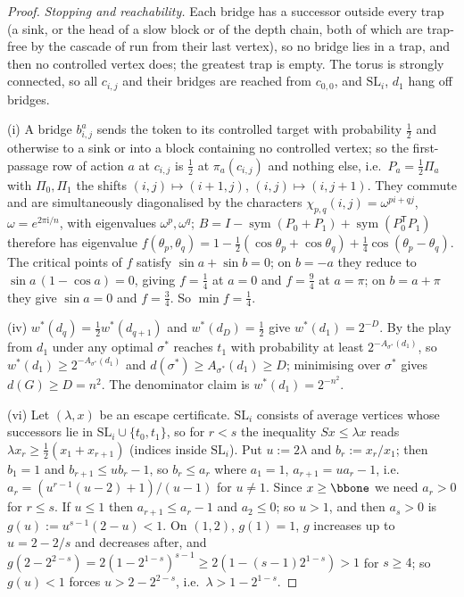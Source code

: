 \begin{proof}
\emph{Stopping and reachability.} Each bridge has a successor outside every
trap (a sink, or the head of a slow block or of the depth chain, both of which
are trap-free by the cascade of  run from their last
vertex), so no bridge lies in a trap, and then no controlled vertex does; the
greatest trap is empty. The torus is strongly connected, so all $c_{i,j}$ and
their bridges are reached from $c_{0,0}$, and $\mathrm{SL}_i$, $d_1$ hang off
bridges.

(i) A bridge $b^{a}_{i,j}$ sends the token to its controlled target with
probability $\tfrac12$ and otherwise to a sink or into a block containing no
controlled vertex; so the first-passage row of action $a$ at $c_{i,j}$ is
$\tfrac12$ at $\pi_a(c_{i,j})$ and nothing else, i.e.\ $P_a=\tfrac12\Pi_a$ with
$\Pi_0,\Pi_1$ the shifts $(i,j)\mapsto(i+1,j)$, $(i,j)\mapsto(i,j+1)$. They
commute and are simultaneously diagonalised by the characters
$\chi_{p,q}(i,j)=\omega^{pi+qj}$, $\omega=e^{2\pi\mathrm i/n}$, with eigenvalues
$\omega^{p},\omega^{q}$; $B=I-\operatorname{sym}(P_0+P_1)+\operatorname{sym}(P_0^{\mathsf T}P_1)$
therefore has eigenvalue
$f(\theta_p,\theta_q)=1-\tfrac12(\cos\theta_p+\cos\theta_q)+\tfrac14\cos(\theta_p-\theta_q)$.
The critical points of $f$ satisfy $\sin a+\sin b=0$; on $b=-a$ they reduce to
$\sin a\,(1-\cos a)=0$, giving $f=\tfrac14$ at $a=0$ and $f=\tfrac94$ at
$a=\pi$; on $b=a+\pi$ they give $\sin a=0$ and $f=\tfrac34$. So
$\min f=\tfrac14$.

(iv) $w^\ast(d_q)=\tfrac12w^\ast(d_{q+1})$ and $w^\ast(d_D)=\tfrac12$ give
$w^\ast(d_1)=2^{-D}$. By  the play from $d_1$ under
any optimal $\sigma^{\ast}$ reaches $t_1$ with probability at least
$2^{-A_{\sigma^\ast}(d_1)}$, so $w^\ast(d_1)\ge2^{-A_{\sigma^{\ast}}(d_1)}$ and
$d(\sigma^{\ast})\ge A_{\sigma^{\ast}}(d_1)\ge D$; minimising over
$\sigma^{\ast}$ gives $d(G)\ge D=n^{2}$. The denominator claim is
$w^\ast(d_1)=2^{-n^{2}}$.

(vi) Let $(\lambda,x)$ be an escape certificate. $\mathrm{SL}_i$ consists of
average vertices whose successors lie in $\mathrm{SL}_i\cup\{t_0,t_1\}$, so for
$r<s$ the inequality $Sx\le\lambda x$ reads
$\lambda x_r\ge\tfrac12(x_1+x_{r+1})$ (indices inside $\mathrm{SL}_i$). Put
$u:=2\lambda$ and $b_r:=x_r/x_1$; then $b_1=1$ and $b_{r+1}\le ub_r-1$, so
$b_r\le a_r$ where $a_1=1$, $a_{r+1}=ua_r-1$, i.e.\
$a_r=(u^{r-1}(u-2)+1)/(u-1)$ for $u\ne1$. Since $x\ge\bbone$ we need
$a_r>0$ for $r\le s$. If $u\le1$ then $a_{r+1}\le a_r-1$ and $a_2\le0$; so
$u>1$, and then $a_s>0$ is $g(u):=u^{s-1}(2-u)<1$. On $(1,2)$, $g(1)=1$, $g$
increases up to $u=2-2/s$ and decreases after, and
$g(2-2^{2-s})=2(1-2^{1-s})^{s-1}\ge2(1-(s-1)2^{1-s})>1$ for $s\ge4$; so
$g(u)<1$ forces $u>2-2^{2-s}$, i.e.\ $\lambda>1-2^{1-s}$.


\end{proof}
